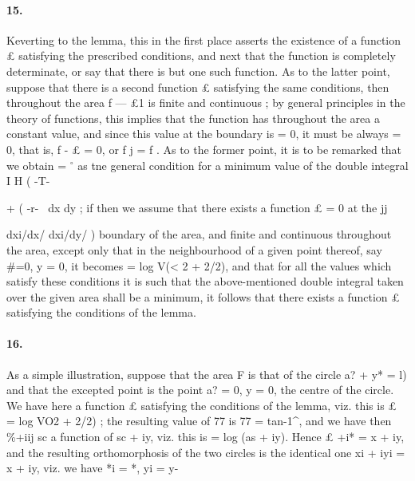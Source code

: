 \documentclass[11pt,a4paper]{book}
\begin{document}
{{{{{{\paragraph{15.} Keverting  to  the  lemma,  this  in  the  first  place  asserts  the  existence  of  a
function  £  satisfying  the  prescribed  conditions,  and  next  that  the  function  is  completely
determinate,  or  say  that  there  is  but  one  such  function.  As  to  the  latter  point,
suppose  that  there  is  a  second  function  £  satisfying  the  same  conditions,  then
throughout  the  area  f  ---  £1  is  finite  and  continuous  ;  by  general  principles  in  the
theory  of  functions,  this  implies  that  the  function  has  throughout  the  area  a  constant
value,  and  since  this  value  at  the  boundary  is  =  0,  it  must  be  always  =  0,  that  is,
f  -  £  =  0,  or  f
j  =  f  .  As  to  the  former  point,  it  is  to  be  remarked  that  we  obtain
=  $^\circ$   as   tne   general    condition    for    a    minimum    value    of    the    double    integral
I  H  (
-T-  }  +  (
-r-  
\
dx  dy  ;    if  then    we   assume   that   there    exists   a   function    £  =  0   at   the
jj  {dxi/dx/      dxi/dy/  )
boundary  of  the  area,  and  finite  and  continuous  throughout  the  area,  except  only
that  in  the  neighbourhood  of  a  given  point  thereof,  say  \#=0,  y  =  0,  it  becomes
=  log  V(< 2  +  2/2),  and  that  for  all  the  values  which  satisfy  these  conditions  it  is  such
that  the  above-mentioned  double  integral  taken  over  the  given  area  shall  be  a
minimum,  it  follows  that  there  exists  a  function  £  satisfying  the  conditions  of  the
lemma.
\paragraph{16.} As  a  simple  illustration,  suppose  that  the  area  F  is  that  of  the  circle
a?  +  y*  =  l)  and  that  the  excepted  point  is  the  point  a?  =  0,  y  =  0,  the  centre  of  the
circle.  We  have  here  a  function  £  satisfying  the  conditions  of  the  lemma,  viz.  this
is   £  =  log  VO2  +  2/2)  ;    the   resulting   value   of  77   is   77  =  tan-1^,   and  we  have  then   \%+iij
sc
a  function  of  sc  +  iy,  viz.  this  is  =  log  (as  +  iy).  Hence  £  +i*  =  x  +  iy,  and  the  resulting
orthomorphosis  of  the  two  circles  is  the  identical  one
xi  +  iyi  =  x  +  iy,
viz.  we  have
*i  =  *,     yi  =  y-


}}}}}}
\end{document}
